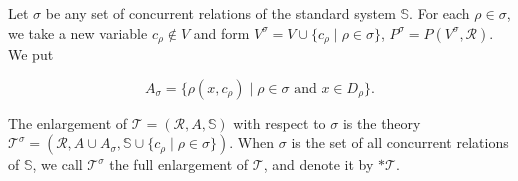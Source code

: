 Let $\sigma$ be any set of concurrent relations of the standard system $\mathbb{S}$. For each $\rho \in \sigma$, we take a new variable $c_\rho \notin V$ and form $V^\sigma = V \cup \{c_\rho \mid \rho \in \sigma\}$, $P^\sigma = P(V^\sigma, \mathcal{R})$. We put

$$A_\sigma = \{ \rho(x, c_\rho) \mid \rho \in \sigma \text{ and } x \in D_\rho \}.$$

The enlargement of $\mathcal{T} = (\mathcal{R}, A, \mathbb{S})$ with respect to $\sigma$ is the theory $\mathcal{T}^\sigma = (\mathcal{R}, A \cup A_\sigma, \mathbb{S} \cup \{c_\rho \mid \rho \in \sigma\})$. When $\sigma$ is the set of all concurrent relations of $\mathbb{S}$, we call $\mathcal{T}^\sigma$ the full enlargement of $\mathcal{T}$, and denote it by $*\mathcal{T}$.
